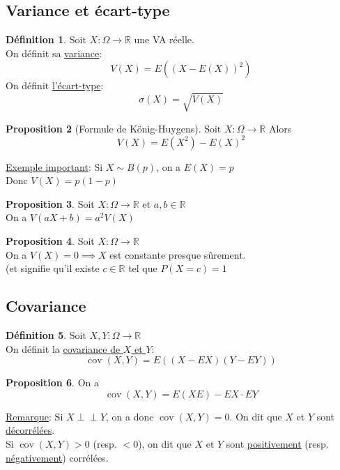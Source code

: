\documentclass[10pt,a4paper]{article}
\theoremstyle{definition}
\newtheorem{proposition}{Proposition}[section]
\newtheorem{definition}[proposition]{Définition}
\DeclareMathOperator{\cov}{cov}
\newcommand{\indep}{\mathrel{\perp \!\!\! \perp}}
\begin{document}
\subsection{Variance et écart-type}
\begin{definition}
Soit $X: \Omega \to \mathbb{R}$ une VA réelle. \\
On définit sa \uline{variance}:
\[ V(X) = E((X - E(X))^2) \]
On définit \uline{l'écart-type}:
\[ \sigma(X) = \sqrt{V(X)} \]
\end{definition}
\begin{proposition}[Formule de König-Huygens]
Soit $X: \Omega \to \mathbb{R}$
Alors
\[ V(X) = E(X^2) - E(X)^2 \]
\end{proposition}
\noindent \uline{Exemple important}: Si $X \sim B(p)$, on a $E(X) = p$ \\
Donc $V(X) = p(1 - p)$
\begin{proposition}
Soit $X: \Omega \to \mathbb{R}$ et $a, b \in \mathbb{R}$ \\
On a $V(aX + b) = a^2 V(X)$
\end{proposition}
\begin{proposition}
Soit $X: \Omega \to \mathbb{R}$ \\
On a $V(X) = 0 \implies X$ est constante presque sûrement. \\
(et signifie qu'il existe $c \in \mathbb{R}$ tel que $P(X = c) = 1$
\end{proposition}

\subsection{Covariance}
\begin{definition}
Soit $X, Y: \Omega \to \mathbb{R}$ \\
On définit la \uline{covariance de $X$ et $Y$}: 
\[ \cov(X, Y) = E\left((X - EX)(Y - EY)\right) \]
\end{definition}
\begin{proposition}
On a
\[ \cov(X, Y) = E(XE) - EX \cdot EY \]
\end{proposition}
\noindent \uline{Remarque}: Si $X \indep Y$, on a donc $\cov(X, Y) = 0$. On dit que $X$ et $Y$ sont \uline{décorrélées}. \\
Si $\cov(X, Y) > 0$ (resp. $< 0$), on dit que $X$ et $Y$ sont \uline{positivement} (resp. \uline{négativement}) corrélées. \medskip
\end{document}
